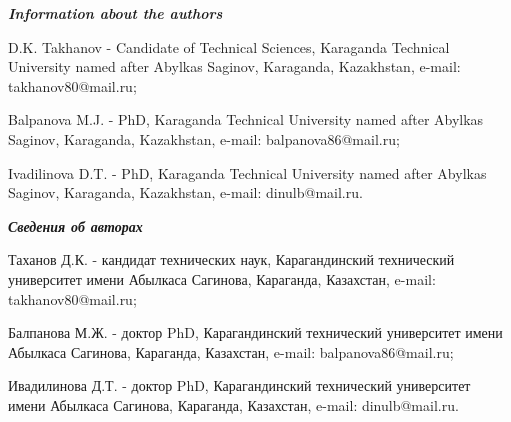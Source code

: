 \emph{{\bfseries Information about the authors}}

\begin{noparindent}
D.K. Takhanov - Candidate of Technical Sciences, Karaganda Technical
University named after Abylkas Saginov, Karaganda, Kazakhstan, e-mail:
takhanov80@mail.ru;

Balpanova M.J. - PhD, Karaganda Technical University named after Abylkas
Saginov, Karaganda, Kazakhstan, e-mail: balpanova86@mail.ru;

Ivadilinova D.T. - PhD, Karaganda Technical University named after
Abylkas Saginov, Karaganda, Kazakhstan, e-mail: dinulb@mail.ru.
\end{noparindent}

\emph{{\bfseries Сведения об авторах}}

\begin{noparindent}
Таханов Д.К. - кандидат технических наук, Карагандинский технический
университет имени Абылкаса Сагинова, Караганда, Казахстан, e-mail:
takhanov80@mail.ru;

Балпанова М.Ж. - доктор PhD, Карагандинский технический университет
имени Абылкаса Сагинова, Караганда, Казахстан, e-mail:
balpanova86@mail.ru;

Ивадилинова Д.Т. - доктор PhD, Карагандинский технический университет
имени Абылкаса Сагинова, Караганда, Казахстан, e-mail: dinulb@mail.ru.
\end{noparindent}




